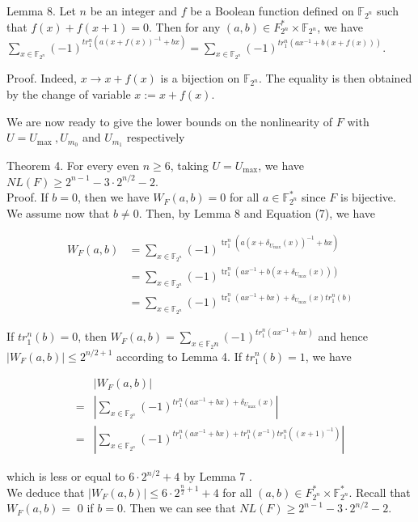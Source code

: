 \documentclass[10pt]{article}
\begin{document}
Lemma 8. Let $n$ be an integer and $f$ be a Boolean function defined on $\mathbb{F}_{2^{n}}$ such that $f(x)+ f(x+1)=0$. Then for any $(a, b) \in F_{2^{n}}^{*} \times \mathbb{F}_{2^{n}}$, we have $\sum_{x \in \mathbb{F}_{2^{n}}}(-1)^{t r_{1}^{n}\left(a(x+f(x))^{-1}+b x\right)}= \sum_{x \in \mathbb{F}_{2^{n}}}(-1)^{t r_{1}^{n}\left(a x^{-1}+b(x+f(x))\right)}$.

Proof. Indeed, $x \rightarrow x+f(x)$ is a bijection on $\mathbb{F}_{2^{n}}$. The equality is then obtained by the change of variable $x:=x+f(x)$.

We are now ready to give the lower bounds on the nonlinearity of $F$ with $U=U_{\text {max }}, U_{m_{0}}$ and $U_{m_{1}}$ respectively

Theorem 4. For every even $n \geq 6$, taking $U=U_{\max }$, we have $N L(F) \geq 2^{n-1}-3 \cdot 2^{n / 2}-2$.\\
Proof. If $b=0$, then we have $W_{F}(a, b)=0$ for all $a \in \mathbb{F}_{2^{n}}^{*}$ since $F$ is bijective. We assume now that $b \neq 0$. Then, by Lemma 8 and Equation (7), we have

$$
\begin{aligned}
W_{F}(a, b) & =\sum_{x \in \mathbb{F}_{2^{n}}}(-1)^{\operatorname{tr}_{1}^{n}\left(a\left(x+\delta_{U_{\max }}(x)\right)^{-1}+b x\right)} \\
& =\sum_{x \in \mathbb{F}_{2^{n}}}(-1)^{\operatorname{tr}_{1}^{n}\left(a x^{-1}+b\left(x+\delta_{U_{\max }}(x)\right)\right)} \\
& =\sum_{x \in \mathbb{F}_{2^{n}}}(-1)^{\operatorname{tr}_{1}^{n}\left(a x^{-1}+b x\right)+\delta_{U_{\max }}(x) t r_{1}^{n}(b)}
\end{aligned}
$$

If $t r_{1}^{n}(b)=0$, then $W_{F}(a, b)=\sum_{x \in \mathbb{F}_{2} n}(-1)^{t r_{1}^{n}\left(a x^{-1}+b x\right)}$ and hence $\left|W_{F}(a, b)\right| \leq 2^{n / 2+1}$ according to Lemma 4. If $t r_{1}^{n}(b)=1$, we have

$$
\begin{aligned}
& \left|W_{F}(a, b)\right| \\
= & \left|\sum_{x \in \mathbb{F}_{2^{n}}}(-1)^{t r_{1}^{n}\left(a x^{-1}+b x\right)+\delta_{U_{\max }}(x)}\right| \\
= & \left|\sum_{x \in \mathbb{F}_{2^{n}}}(-1)^{t r_{1}^{n}\left(a x^{-1}+b x\right)+t r_{1}^{n}\left(x^{-1}\right) t r_{1}^{n}\left((x+1)^{-1}\right)}\right|
\end{aligned}
$$

which is less or equal to $6 \cdot 2^{n / 2}+4$ by Lemma 7 .\\
We deduce that $\left|W_{F}(a, b)\right| \leq 6 \cdot 2^{\frac{n}{2}+1}+4$ for all $(a, b) \in F_{2^{n}}^{*} \times \mathbb{F}_{2^{n}}^{*}$. Recall that $W_{F}(a, b)=$ 0 if $b=0$. Then we can see that $N L(F) \geq 2^{n-1}-3 \cdot 2^{n / 2}-2$.
\end{document}
